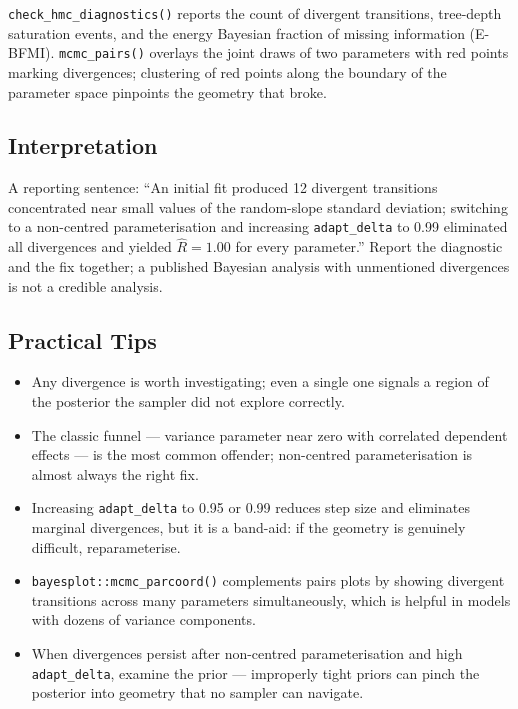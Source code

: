 \documentclass[
]{article}
\providecommand{\tightlist}{%
  \setlength{\itemsep}{0pt}\setlength{\parskip}{0pt}}
\begin{document}
\texttt{check\_hmc\_diagnostics()} reports the count of divergent
transitions, tree-depth saturation events, and the energy Bayesian
fraction of missing information (E-BFMI). \texttt{mcmc\_pairs()}
overlays the joint draws of two parameters with red points marking
divergences; clustering of red points along the boundary of the
parameter space pinpoints the geometry that broke.

\subsection{Interpretation}\label{interpretation}

A reporting sentence: ``An initial fit produced 12 divergent transitions
concentrated near small values of the random-slope standard deviation;
switching to a non-centred parameterisation and increasing
\texttt{adapt\_delta} to 0.99 eliminated all divergences and yielded
\(\hat R = 1.00\) for every parameter.'' Report the diagnostic and the
fix together; a published Bayesian analysis with unmentioned divergences
is not a credible analysis.

\subsection{Practical Tips}\label{practical-tips}

\begin{itemize}
\tightlist
\item
  Any divergence is worth investigating; even a single one signals a
  region of the posterior the sampler did not explore correctly.
\item
  The classic funnel --- variance parameter near zero with correlated
  dependent effects --- is the most common offender; non-centred
  parameterisation is almost always the right fix.
\item
  Increasing \texttt{adapt\_delta} to 0.95 or 0.99 reduces step size and
  eliminates marginal divergences, but it is a band-aid: if the geometry
  is genuinely difficult, reparameterise.
\item
  \texttt{bayesplot::mcmc\_parcoord()} complements pairs plots by
  showing divergent transitions across many parameters simultaneously,
  which is helpful in models with dozens of variance components.
\item
  When divergences persist after non-centred parameterisation and high
  \texttt{adapt\_delta}, examine the prior --- improperly tight priors
  can pinch the posterior into geometry that no sampler can navigate.
\end{itemize}
\end{document}
